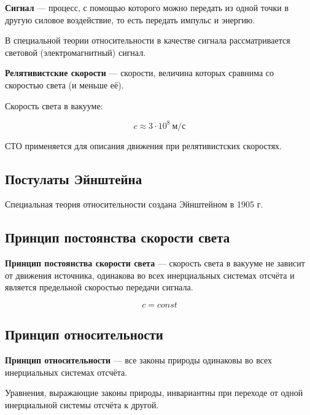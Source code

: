 \documentclass[a4paper,12pt]{article}
\begin{document}
\begin{definitionbox}
\textbf{Сигнал} — процесс, с помощью которого можно передать из одной точки в другую силовое воздействие, то есть передать импульс и энергию.
\end{definitionbox}

В специальной теории относительности в качестве сигнала рассматривается световой (электромагнитный) сигнал.

\begin{definitionbox}
\textbf{Релятивистские скорости} — скорости, величина которых сравнима со скоростью света (и меньше её).
\end{definitionbox}

Скорость света в вакууме:

\[
c \approx 3 \cdot 10^8 \ \text{м/с}
\]

СТО применяется для описания движения при релятивистских скоростях.

\subsection*{Постулаты Эйнштейна}

Специальная теория относительности создана Эйнштейном в 1905 г.

\subsection*{Принцип постоянства скорости света}

\begin{definitionbox}
\textbf{Принцип постоянства скорости света} — скорость света в вакууме не зависит от движения источника, одинакова во всех инерциальных системах отсчёта и является предельной скоростью передачи сигнала.
\end{definitionbox}

\[
c = const
\]

\subsection*{Принцип относительности}

\begin{definitionbox}
\textbf{Принцип относительности} — все законы природы одинаковы во всех инерциальных системах отсчёта.
\end{definitionbox}

Уравнения, выражающие законы природы, инвариантны при переходе от одной инерциальной системы отсчёта к другой.
\end{document}
